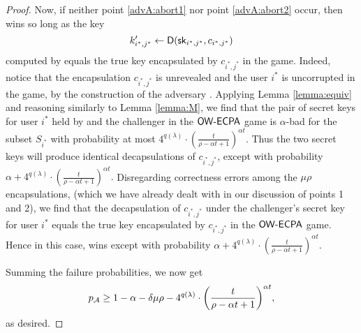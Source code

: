 \begin{proof}
  Now, if neither point \ref{advA:abort1} nor point \ref{advA:abort2} occur,
  then \advA wins so long as the key
  \[
  k_{i^{*},j^{*}}' \leftarrow \mathsf{D}(\mathsf{sk}_{i^{*},j^{*}}, c_{i^{*},j^{*}})
  \]
  computed by \advA equals the true key encapsulated by \(c_{i^{*},j^{*}}\) in the game.
  Indeed, notice that the encapsulation \(c_{i^{*},j^{*}}\) is unrevealed
  and the user \(i^{*}\) is uncorrupted in the \OWECPA game,
  by the construction of the adversary \advA.
  Applying Lemma \ref{lemma:equiv}
  and reasoning similarly to Lemma \ref{lemma:M},
  we find that the pair of secret keys for user \(i^{*}\) held by \advA
  and the challenger in the \(\mathsf{OW}\text{-}\mathsf{ECPA}\) game is
  \(\alpha\)-bad for the subset \(S_{i^{*}}\) with probability at most
  \(
    4^{q(\lambda)} \cdot \left( \frac{t}{\rho - \alpha t + 1} \right)^{\alpha t}.
  \)
  Thus the two secret keys will produce identical decapsulations of \(c_{i^{*},j^{*}}\), except with probability
  \(
    \alpha +
    4^{q(\lambda)} \cdot \left( \frac{t}{\rho - \alpha t + 1} \right)^{\alpha t}.
  \)
  Disregarding correctness errors among the \(\mu \rho\) encapsulations,
  (which we have already dealt with in our discussion of points 1 and 2),
  we find that the decapsulation of \(c_{i^{*},j^{*}}\)
  under the challenger's secret key for user \(i^{*}\)
  equals the true key encapsulated by \(c_{i^{*},j^{*}}\) in the \(\mathsf{OW}\text{-}\mathsf{ECPA}\) game.
  Hence in this case, \advA wins except with probability
  \(
  \alpha
  + 4^{q(\lambda)} \cdot \left( \frac{t}{\rho - \alpha t + 1} \right)^{\alpha t}.
  \)

  Summing the failure probabilities, we now get
  \[
    p_{\advA} \ge 1 - \alpha - \delta \mu \rho
    - 4^{q(\lambda)} \cdot \left( \frac{t}{\rho - \alpha t + 1} \right)^{\alpha t},
  \]
  as desired.
\end{proof}


